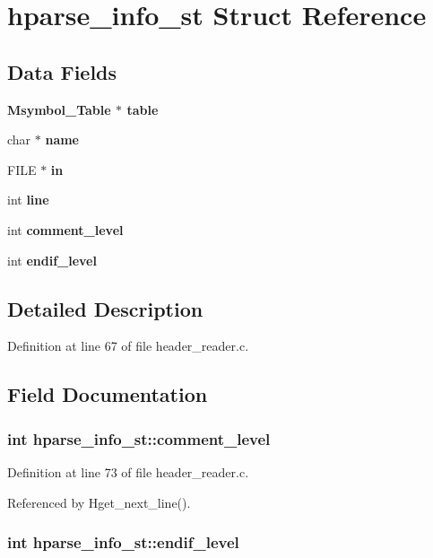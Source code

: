 \section{hparse\_\-info\_\-st Struct Reference}
\label{structhparse__info__st}
\subsection*{Data Fields}
\begin{CompactItemize}
\item 
\bf{Msymbol\_\-Table} $\ast$ \bf{table}
\item 
char $\ast$ \bf{name}
\item 
FILE $\ast$ \bf{in}
\item 
int \bf{line}
\item 
int \bf{comment\_\-level}
\item 
int \bf{endif\_\-level}
\end{CompactItemize}


\subsection{Detailed Description}




Definition at line 67 of file header\_\-reader.c.

\subsection{Field Documentation}
\subsubsection{\setlength{\rightskip}{0pt plus 5cm}int \bf{hparse\_\-info\_\-st::comment\_\-level}}\label{structhparse__info__st_974f8dc473d77e6e5fd98d32004e1339}




Definition at line 73 of file header\_\-reader.c.

Referenced by Hget\_\-next\_\-line().
\subsubsection{\setlength{\rightskip}{0pt plus 5cm}int \bf{hparse\_\-info\_\-st::endif\_\-level}}\label{structhparse__info__st_d88de4942e534b3a566cfef184eb944d}




